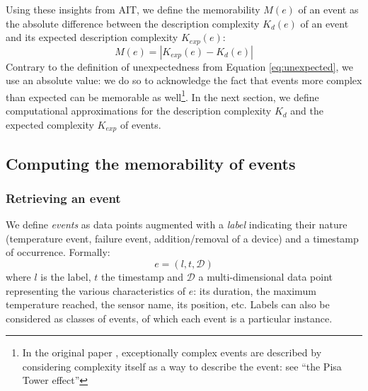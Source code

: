 \documentclass[entropy,article,submit,moreauthors,pdftex]{Definitions/mdpi}
\begin{document}
Using these insights from AIT, we define the memorability $M(e)$ of an event as the absolute difference between the description complexity $K_d(e)$ of an event and its expected description complexity $K_{exp}(e)$:
\begin{equation}
    \label{eq:memorability}
    M(e) = |K_{exp}(e) - K_d(e)|
\end{equation}
Contrary to the definition of unexpectedness from Equation \ref{eq:unexpected}, we use an absolute value: we do so to acknowledge the fact that events more complex than expected can be memorable as well\footnote{In the original paper \cite{dessalles2011coincidences}, exceptionally complex events are described by considering complexity itself as a way to describe the event: see ``the Pisa Tower effect''\cite{dessalles_pisa_nodate}}. In the next section, we define computational approximations for the description complexity $K_d$ and the expected complexity $K_{exp}$ of events.

\subsection{Computing the memorability of events}
\label{sec:computing}
\subsubsection{Retrieving an event}

We define \emph{events} as data points augmented with a \emph{label} indicating their nature (temperature event, failure event, addition/removal of a device) and a timestamp of occurrence. Formally:
\begin{equation}
    \label{eq:event}
    e = (l, t,\mathcal{D})
\end{equation}
where $l$ is the label, $t$ the timestamp and $\mathcal{D}$ a multi-dimensional data point representing the various characteristics of $e$: its duration, the maximum temperature reached, the sensor name, its position, etc. Labels can also be considered as classes of events, of which each event is a particular instance.
\end{document}
